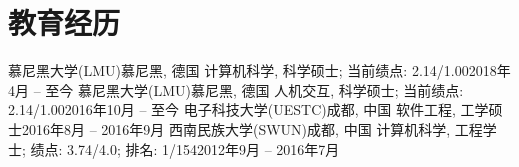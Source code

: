 \section{\textbf{教育经历}}
  \resumeSubHeadingListStart
    \resumeSubheading
      {慕尼黑大学(LMU)}{慕尼黑, 德国}
      {计算机科学, 科学硕士; 当前绩点: 2.14/1.00}{2018年4月 -- 至今}
    \resumeSubheading
      {慕尼黑大学(LMU)}{慕尼黑, 德国}
      {人机交互, 科学硕士; 当前绩点: 2.14/1.00}{2016年10月 -- 至今}
    \resumeSubheading
      {电子科技大学(UESTC)}{成都, 中国}
      {软件工程, 工学硕士}{2016年8月 -- 2016年9月}
    \resumeSubheading
      {西南民族大学(SWUN)}{成都, 中国}
      {计算机科学, 工程学士; 绩点: 3.74/4.0; 排名: 1/154}{2012年9月 -- 2016年7月}
  \resumeSubHeadingListEnd